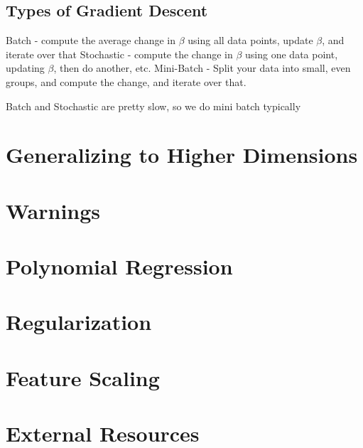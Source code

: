 \documentclass{article}
\begin{document}
\subsection{Types of Gradient Descent}
Batch - compute the average change in $\beta$ using all data points, update $\beta$, and iterate over that
Stochastic - compute the change in $\beta$ using one data point, updating $\beta$, then do another, etc.
Mini-Batch - Split your data into small, even groups, and compute the change, and iterate over that.

Batch and Stochastic are pretty slow, so we do mini batch typically

\section{Generalizing to Higher Dimensions}

\section{Warnings}

\section{Polynomial Regression}

\section{Regularization}

\section{Feature Scaling}

\section{External Resources}
\end{document}
